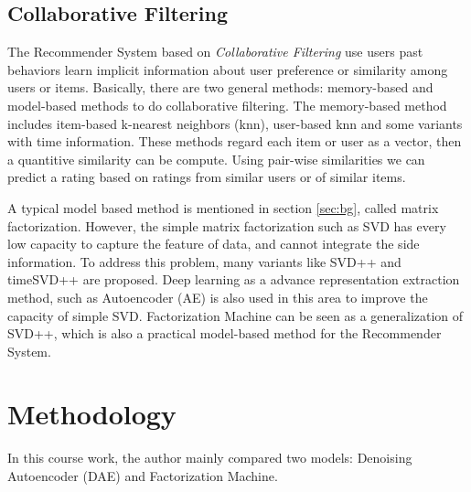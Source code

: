 \documentclass{article}
\newcommand{\bs}{\boldsymbol}
\begin{document}

\subsection{Collaborative Filtering}\label{sec:cf}
The Recommender System based on {\em Collaborative Filtering} use users past behaviors learn implicit information about user preference or similarity among users or items. Basically, there are two general methods: memory-based and model-based methods to do collaborative filtering. The memory-based method includes item-based k-nearest neighbors (knn), user-based knn\cite{} and some variants with time information. These methods regard each item or user as a vector, then a quantitive similarity can be compute. Using pair-wise similarities we can predict a rating based on ratings from similar users or of similar items.

A typical model based method is mentioned in section \ref{sec:bg}, called matrix factorization\cite{}. However, the simple matrix factorization such as SVD has every low capacity to capture the feature of data, and cannot integrate the side information. To address this problem, many variants like SVD++\cite{} and timeSVD++\cite{} are proposed. Deep learning as a advance representation extraction method, such as Autoencoder (AE) is also used in this area to improve the capacity of simple SVD. Factorization Machine can be seen as a generalization of SVD++, which is also a practical model-based method for the Recommender System.

\section{Methodology}\label{sec:method}
In this course work, the author mainly compared two models: Denoising Autoencoder (DAE) and Factorization Machine. 
\end{document}
